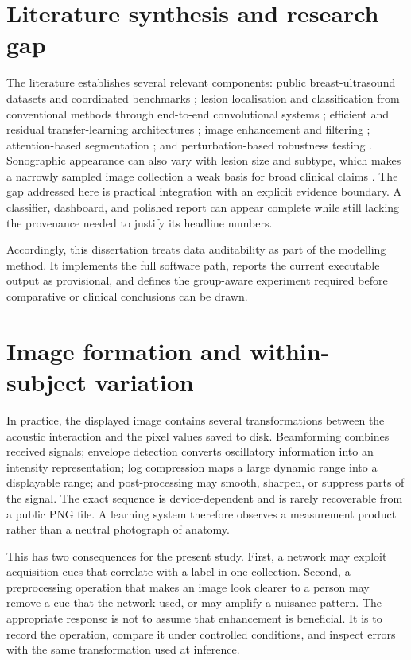 \section{Literature synthesis and research gap}
The literature establishes several relevant components: public breast-ultrasound datasets and coordinated benchmarks \citep{AlDhabyani2020,Piotrzkowska2017,Thomas2023,Pawlowska2024}; lesion localisation and classification from conventional methods through end-to-end convolutional systems \citep{Yap2008,Yap2009,Yap2018,Yap2019,Yap2020ROI,Cheng2016,Zeimarani2020}; efficient and residual transfer-learning architectures \citep{He2016,Tan2019}; image enhancement and filtering \citep{Zuiderveld1994,Yap2010,Osman2018}; attention-based segmentation \citep{Chen2023}; and perturbation-based robustness testing \citep{Jiang2023}. Sonographic appearance can also vary with lesion size and subtype, which makes a narrowly sampled image collection a weak basis for broad clinical claims \citep{Yoon2018}. The gap addressed here is practical integration with an explicit evidence boundary. A classifier, dashboard, and polished report can appear complete while still lacking the provenance needed to justify its headline numbers.

Accordingly, this dissertation treats data auditability as part of the modelling method. It implements the full software path, reports the current executable output as provisional, and defines the group-aware experiment required before comparative or clinical conclusions can be drawn.

\section{Image formation and within-subject variation}
In practice, the displayed image contains several transformations between the acoustic interaction and the pixel values saved to disk. Beamforming combines received signals; envelope detection converts oscillatory information into an intensity representation; log compression maps a large dynamic range into a displayable range; and post-processing may smooth, sharpen, or suppress parts of the signal. The exact sequence is device-dependent and is rarely recoverable from a public PNG file. A learning system therefore observes a measurement product rather than a neutral photograph of anatomy.

This has two consequences for the present study. First, a network may exploit acquisition cues that correlate with a label in one collection. Second, a preprocessing operation that makes an image look clearer to a person may remove a cue that the network used, or may amplify a nuisance pattern. The appropriate response is not to assume that enhancement is beneficial. It is to record the operation, compare it under controlled conditions, and inspect errors with the same transformation used at inference.

